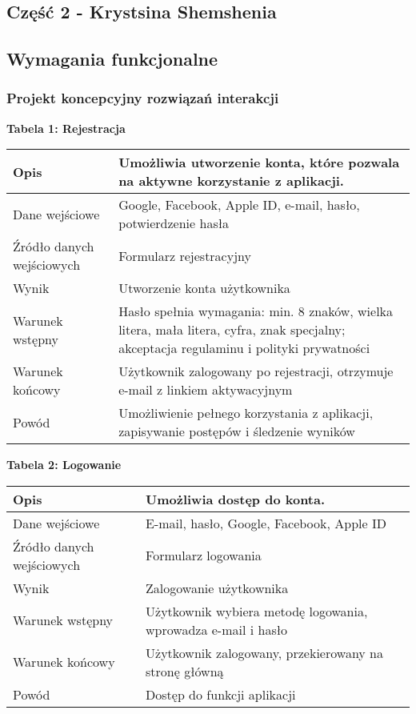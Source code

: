 \begin{center}
  \section{Część 2 - Krystsina Shemshenia}
  \subsection{Wymagania funkcjonalne}
\end{center}

\subsubsection{Projekt koncepcyjny rozwiązań interakcji}

\textbf{Tabela 1: Rejestracja}
\begin{table}[h]
  \begin{tabular}{|p{3cm}|p{\dimexpr\textwidth-3cm\relax}|} \hline
    Opis & Umożliwia utworzenie konta, które pozwala na aktywne korzystanie z aplikacji. \\\hline
    Dane wejściowe & Google, Facebook, Apple ID, e-mail, hasło, potwierdzenie hasła \\\hline
    Źródło danych wejściowych & Formularz rejestracyjny \\\hline
    Wynik & Utworzenie konta użytkownika \\\hline
    Warunek wstępny & Hasło spełnia wymagania: min. 8 znaków, wielka litera, mała litera, cyfra, znak specjalny; akceptacja regulaminu i polityki prywatności \\\hline
    Warunek końcowy & Użytkownik zalogowany po rejestracji, otrzymuje e-mail z linkiem aktywacyjnym \\\hline
    Powód & Umożliwienie pełnego korzystania z aplikacji, zapisywanie postępów i śledzenie wyników \\\hline
  \end{tabular}
\end{table}

\textbf{Tabela 2: Logowanie}
\begin{table}[h]
  \begin{tabular}{|p{3cm}|p{\dimexpr\textwidth-3cm\relax}|} \hline
    Opis & Umożliwia dostęp do konta. \\\hline
    Dane wejściowe & E-mail, hasło, Google, Facebook, Apple ID \\\hline
    Źródło danych wejściowych & Formularz logowania \\\hline
    Wynik & Zalogowanie użytkownika \\\hline
    Warunek wstępny & Użytkownik wybiera metodę logowania, wprowadza e-mail i hasło \\\hline
    Warunek końcowy & Użytkownik zalogowany, przekierowany na stronę główną \\\hline
    Powód & Dostęp do funkcji aplikacji \\\hline
  \end{tabular}
\end{table}

